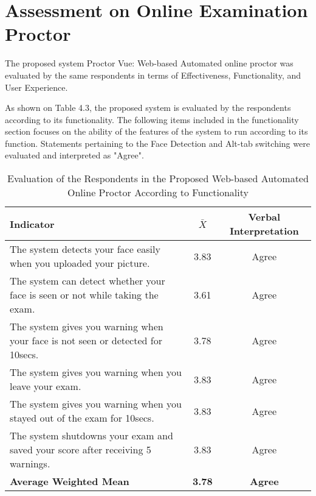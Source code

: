 \section{Assessment on Online Examination Proctor}

The proposed system Proctor Vue: Web-based Automated online proctor was evaluated by the same respondents in terms of Effectiveness, Functionality, and User Experience.

As shown on Table 4.3, the proposed system is evaluated by the respondents according to its functionality.
The following items included in the functionality section focuses on the ability of the features of the system to run according to its function.
Statements pertaining to the Face Detection and Alt-tab switching were evaluated and interpreted as "Agree".

\begin{table}[h!]
   \begin{center}
      \begin{tabular}{|m{20em}|c|c|}
         \hline
         \textbf{Indicator}                                                              & \textbf{$\bar{X}$} & \textbf{Verbal Interpretation} \\
         \hline
         The system detects your face easily when you uploaded your picture.             & 3.83               & Agree                          \\
         \hline
         The system can detect whether your face is seen or not while taking the exam.   & 3.61               & Agree                          \\
         \hline
         The system gives you warning when your face is not seen or detected for 10secs. & 3.78               & Agree                          \\
         \hline
         The system gives you warning when you leave your exam.                          & 3.83               & Agree                          \\
         \hline
         The system gives you warning when you stayed out of the exam for 10secs.        & 3.83               & Agree                          \\
         \hline
         The system shutdowns your exam and saved your score after receiving 5 warnings. & 3.83               & Agree                          \\
         \hline
         \textbf{Average Weighted Mean}                                                  & \textbf{3.78}      & \textbf{Agree}                 \\
         \hline
      \end{tabular}
   \end{center}
   \caption{Evaluation of the Respondents in the Proposed Web-based Automated Online Proctor According to Functionality}
\end{table}

